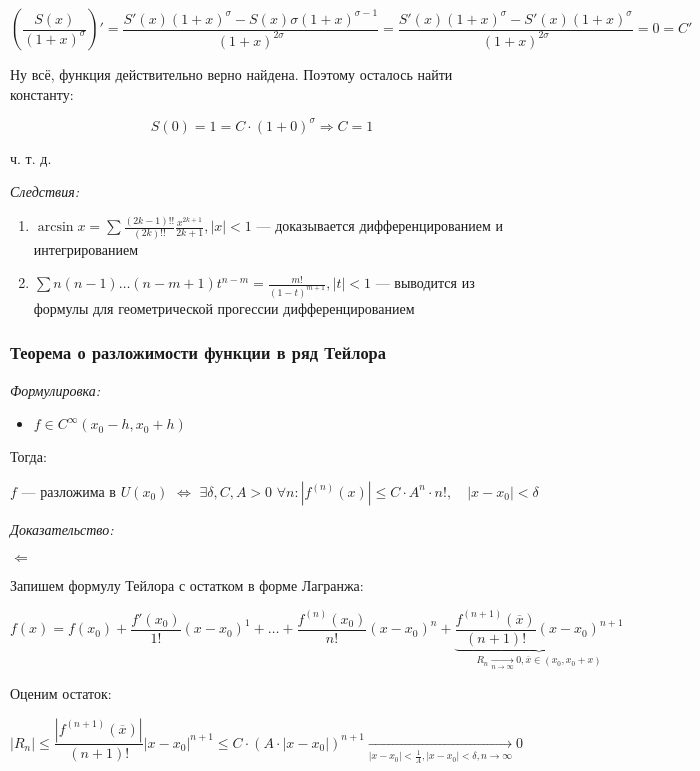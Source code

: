 \documentclass{article}
\def\dbl{\,\,}
\begin{document}
\[\left(\frac{S(x)}{(1 + x)^{\sigma}}\right)' = \frac{S'(x)(1 + x)^{\sigma} - S(x)\sigma(1 + x)^{\sigma - 1}}{(1 + x)^{2\sigma}} = \frac{S'(x)(1 + x)^{\sigma} - S'(x)(1 + x)^{\sigma}}{(1 + x)^{2\sigma}} = 0 = C'\]

Ну всё, функция действительно верно найдена. Поэтому осталось найти константу: 

\[S(0) = 1 = C \cdot (1 + 0)^{\sigma} \Rightarrow C = 1\]

ч. т. д.

\textit{Следствия:}

\begin{enumerate}
    \item $\arcsin x = \sum \frac{(2k - 1)!!}{(2k)!!} \frac{x^{2k + 1}}{2k + 1}, |x| < 1$ --- доказывается дифференцированием и интегрированием
    \item $\sum n(n-1)\ldots(n - m + 1)t^{n - m} = \frac{m!}{(1 - t)^{m + 1}}, |t| < 1$ --- выводится из формулы для геометрической прогессии дифференцированием
\end{enumerate}

\subsubsection{Теорема о разложимости функции в ряд Тейлора}
\textit{Формулировка:}

\begin{itemize}
    \item $f \in C^{\infty}(x_0 - h, x_0 + h)$
\end{itemize}

Тогда:

\[f\text{ --- разложима в } U(x_0) \dbl \Leftrightarrow \dbl \exists \delta, C, A > 0 \dbl \forall n: |f^{(n)}(x)| \le C \cdot A^n \cdot n!, \quad |x - x_0| < \delta\]

\textit{Доказательство:}

\textbf{$\Leftarrow$}

Запишем формулу Тейлора с остатком в форме Лагранжа: 

\[f(x) = f(x_0) + \frac{f'(x_0)}{1!}(x - x_0)^{1} + \ldots + \frac{f^{(n)}(x_0)}{n!}(x - x_0)^n + \underbrace{\frac{f^{(n + 1)}(\overline{x})}{(n + 1)!}(x - x_0)^{n + 1}}_{R_n \underset{n \rightarrow \infty}{\longrightarrow} 0, \overline{x} \in (x_0, x_0 + x)}\]

Оценим остаток: 

\[|R_n| \le \frac{\left|f^{(n + 1)}(\overline{x})\right|}{(n + 1)!}|x - x_0|^{n + 1} \le C \cdot \left(A \cdot |x - x_0| \right)^{n + 1} \underset{|x - x_0| < \frac{1}{A}, |x - x_0| < \delta, n \rightarrow \infty}{\longrightarrow} 0\]
\end{document}
